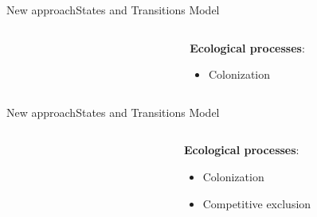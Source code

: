 \documentclass[10pt,aspectratio=149]{beamer}
\begin{document}

\begin{frame}{New approach}{States and Transitions Model}


\begin{columns}[t]
	\begin{column}[t]{.40\paperwidth}
		\begin{figure}
			\small{}
		\end{figure}
	\end{column}
	\begin{column}[t]{.50\paperwidth}
	\textbf{Ecological processes}:
	\begin{itemize}
		\item Colonization
	\end{itemize}
	\end{column}
\end{columns}

\end{frame}


\begin{frame}{New approach}{States and Transitions Model}


\begin{columns}[t]
	\begin{column}[t]{.40\paperwidth}
		\begin{figure}
			\small{}
		\end{figure}
	\end{column}
	\begin{column}[t]{.50\paperwidth}
	\textbf{Ecological processes}:
	\begin{itemize}
		\item Colonization
		\item Competitive exclusion
	\end{itemize}
	\end{column}
\end{columns}

\end{frame}
\end{document}
